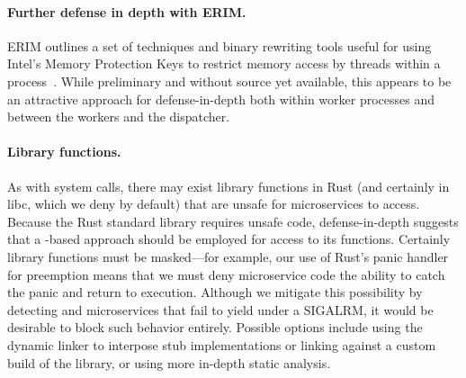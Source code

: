 \paragraph{Further defense in depth with ERIM.}
ERIM outlines a set of techniques and binary rewriting tools useful for using
Intel's Memory Protection Keys to restrict memory access by 
threads within a process~\cite{vahldiek2018erim}.  While preliminary and without
source yet available, this appears to be an attractive approach for
defense-in-depth both within worker processes and between the workers and the dispatcher.



\paragraph{Library functions.}
As with system calls, there may exist library functions in Rust (and certainly
in libc, which we deny by default) that are unsafe for microservices to access.
Because the Rust standard library requires unsafe
code, defense-in-depth suggests that a -based approach should be
employed for access to its functions.  Certainly library functions must
be masked---for example, our use of Rust's panic handler for
preemption means that we must deny microservice code the ability to catch the
panic and return to execution.  Although we mitigate this possibility by
detecting and  microservices that fail to yield under a SIGALRM, it
would be desirable to block such behavior entirely.
Possible
options include using the dynamic linker to interpose stub implementations or
linking against a custom build of the library, or using more in-depth static analysis.




